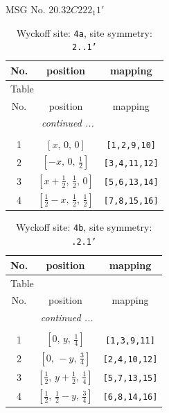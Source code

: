 \documentclass[fleqn,8pt]{jsarticle}
\begin{document}
\setcounter{MaxMatrixCols}{32}

\renewcommand{\tablename}{Table~}
\renewcommand{\figurename}{Figure~}
\begin{center}
\LARGE
MSG No. 20.32\quad$C222_{1}1'$
\end{center}
\renewcommand{\arraystretch}{1.2}
\begin{longtable}{ccc}
\caption{Wyckoff site: {\tt 4a}, site symmetry: {\tt 2..1'}}
 \\
 \hline \hline
No. & position & mapping \\ \hline \endfirsthead

\multicolumn{2}{l}{\tablename\ \thetable{}} \\
 \hline \hline
No. & position & mapping \\ \hline \endhead

 \hline \hline
\multicolumn{2}{r}{\footnotesize\it continued ...} \\ \endfoot

 \hline \hline
\multicolumn{2}{r}{} \\ \endlastfoot

1 & $\left[ x,\, 0,\, 0 \right]$ & {\tt [1,2,9,10]} \\ \hline
2 & $\left[ - x,\, 0,\, \frac{1}{2} \right]$ & {\tt [3,4,11,12]} \\ \hline
3 & $\left[ x + \frac{1}{2},\, \frac{1}{2},\, 0 \right]$ & {\tt [5,6,13,14]} \\ \hline
4 & $\left[ \frac{1}{2} - x,\, \frac{1}{2},\, \frac{1}{2} \right]$ & {\tt [7,8,15,16]} \\
\end{longtable}
\renewcommand{\arraystretch}{1.2}
\begin{longtable}{ccc}
\caption{Wyckoff site: {\tt 4b}, site symmetry: {\tt .2.1'}}
 \\
 \hline \hline
No. & position & mapping \\ \hline \endfirsthead

\multicolumn{2}{l}{\tablename\ \thetable{}} \\
 \hline \hline
No. & position & mapping \\ \hline \endhead

 \hline \hline
\multicolumn{2}{r}{\footnotesize\it continued ...} \\ \endfoot

 \hline \hline
\multicolumn{2}{r}{} \\ \endlastfoot

1 & $\left[ 0,\, y,\, \frac{1}{4} \right]$ & {\tt [1,3,9,11]} \\ \hline
2 & $\left[ 0,\, - y,\, \frac{3}{4} \right]$ & {\tt [2,4,10,12]} \\ \hline
3 & $\left[ \frac{1}{2},\, y + \frac{1}{2},\, \frac{1}{4} \right]$ & {\tt [5,7,13,15]} \\ \hline
4 & $\left[ \frac{1}{2},\, \frac{1}{2} - y,\, \frac{3}{4} \right]$ & {\tt [6,8,14,16]} \\
\end{longtable}
\end{document}
